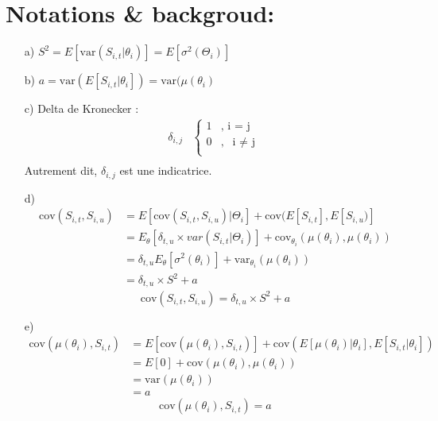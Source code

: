 \documentclass[11pt,french]{report}
\begin{document}
\section{Notations \& backgroud:}
\label{sec:4.1}
\begin{itemize}
\item[a)] $S^{2} = E[\text{var}(S_{i,t}|\theta_i)] = E[\sigma^2(\Theta_i)]$
\item[b)] $a= \text{var}(E[S_{i,t}|\theta_i]) = \text{var}(\mu(\theta_i)$
\item[c)] Delta de Kronecker : 
\begin{align*}
\delta_{i,j} & \left\{
     \begin{array}{rl}
      1 &, \text{ i = j}  \\
      0 &, \text{ i $\neq$ j} \\
     \end{array}
     \right. \\
\end{align*}
Autrement dit, $\delta_{i,j}$ est une indicatrice.
\item[d)] 
\begin{align*}
\text{cov}(S_{i,t}, S_{i,u}) &= E[\text{cov}(S_{i,t}, S_{i,u})|\Theta_i] + \text{cov}(E[S_{i,t}], E[S_{i,u})] \\
&= E_{\theta}[\delta_{t,u} \times var(S_{i,t}|\Theta_i)] + \text{cov}_{\theta_i}(\mu(\theta_i), \mu(\theta_i))\\
&= \delta_{t,u} E_{\theta}[ \sigma^2(\theta_i)] + \text{var}_{\theta_i}(\mu(\theta_i))\\
&= \delta_{t,u}\times S^2 + a 
\end{align*}
\begin{equation}
\label{eq:hypothed}
\text{cov}(S_{i,t},S_{i,u})= \delta_{t,u}\times S^2 + a 
\end{equation}
\item[e)]
\begin{align*}
\text{cov}(\mu(\theta_i), S_{i,t}) &= E[\text{cov}(\mu(\theta_i), S_{i,t})] + \text{cov}(E[\mu(\theta_i)|\theta_i], E[S_{i,t}|\theta_i]) \\
&= E[0] + \text{cov}(\mu(\theta_i), \mu(\theta_i))\\
&= \text{var}(\mu(\theta_i))\\
&= a
\end{align*}
\begin{equation}
\label{eq:hypothee}
\text{cov}(\mu(\theta_i),S_{i,t})=  a 
\end{equation}
\end{itemize}
\end{document}
